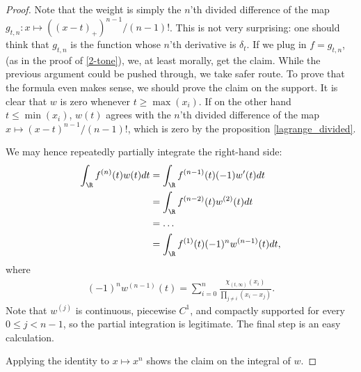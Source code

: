 \begin{proof}
	Note that the weight is simply the $n$'th divided difference of the map $g_{t, n} : x \mapsto ((x - t)_{+})^{n - 1}/(n - 1)!$. This is not very surprising: one should think that $g_{t, n}$ is the function whose $n$'th derivative is $\delta_{t}$. If we plug in $f = g_{t, n}$, (as in the proof of \ref{2-tone}), we, at least morally, get the claim. While the previous argument could be pushed through, we take safer route. To prove that the formula even makes sense, we should prove the claim on the support. It is clear that $w$ is zero whenever $t \geq \max(x_{i})$. If on the other hand $t \leq \min(x_{i})$, $w(t)$ agrees with the $n$'th divided difference of the map $x \mapsto (x - t)^{n - 1}/(n - 1)!$, which is zero by the proposition \ref{lagrange_divided}.

	We may hence repeatedly partially integrate the right-hand side:
	\begin{align*}
		 \int_{\R} f^{(n)}(t) w(t) dt &= \int_{\R} f^{(n - 1)}(t) (-1) w'(t) dt \\
		 &= \int_{\R} f^{(n - 2)}(t) w^{(2)}(t) dt \\
		 &= \ldots \\
		 &= \int_{\R} f^{(1)}(t) (-1)^{n} w^{(n - 1)}(t) dt,
	\end{align*}
	where
	\begin{align*}
		(-1)^{n} w^{(n - 1)}(t) = \sum_{i = 0}^{n} \frac{\chi_{(t, \infty)}(x_{i})}{\prod_{j \neq i} (x_{i} - x_{j})}.
	\end{align*}
	Note that $w^{(j)}$ is continuous, piecewise $C^{1}$, and compactly supported for every $0 \leq j < n - 1$, so the partial integration is legitimate. The final step is an easy calculation.

	Applying the identity to $x \mapsto x^{n}$ shows the claim on the integral of $w$.


\end{proof}
